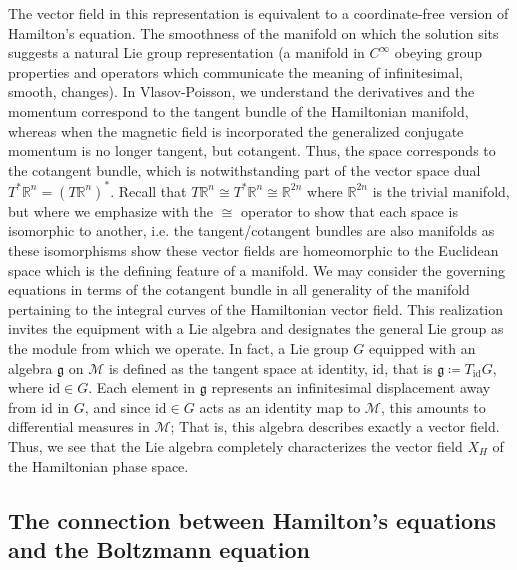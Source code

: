 \documentclass[11pt,titlepage]{report}
\begin{document}
The vector field in this representation is equivalent to a coordinate-free version of Hamilton's equation. The smoothness of the manifold on which the solution sits suggests a natural Lie group representation (a manifold in $C^{\infty}$ obeying group properties and operators which communicate the meaning of infinitesimal, smooth, changes). In Vlasov-Poisson, we understand the derivatives and the momentum correspond to the tangent bundle of the Hamiltonian manifold, whereas when the magnetic field is incorporated the generalized conjugate momentum is no longer tangent, but cotangent. Thus, the space corresponds to the cotangent bundle, which is notwithstanding part of the vector space dual $T^*\mathbb{R}^n = (T\mathbb{R}^n)^*$. Recall that $T\mathbb{R}^n \cong T^*\mathbb{R}^n \cong \mathbb{R}^{2n}$ where $\mathbb{R}^{2n}$ is the trivial manifold, but where we emphasize with the $\cong$ operator to show that each space is isomorphic to another, i.e. the tangent/cotangent bundles are also manifolds as these isomorphisms show these vector fields are homeomorphic to the Euclidean space which is the defining feature of a manifold. We may consider the governing equations in terms of the cotangent bundle in all generality of the manifold pertaining to the integral curves of the Hamiltonian vector field. This realization invites the equipment with a Lie algebra and designates the general Lie group as the module from which we operate. In fact, a Lie group $G$ equipped with an algebra $\mathfrak{g}$ on $\mathcal{M}$ is defined as the tangent space at identity, $\mathrm{id}$, that is $\mathfrak{g} \coloneqq T_{\mathrm{id}}G$, where $\mathrm{id}\in G$. Each element in $\mathfrak{g}$ represents an infinitesimal displacement away from $\mathrm{id}$ in $G$, and since $\mathrm{id}\in G$ acts as an identity map to $\mathcal{M}$, this amounts to differential measures in $\mathcal{M}$; That is, this algebra describes exactly a vector field. Thus, we see that the Lie algebra completely characterizes the vector field $X_H$ of the Hamiltonian phase space.



\subsection{The connection between Hamilton's equations and the Boltzmann equation}

\end{document}
